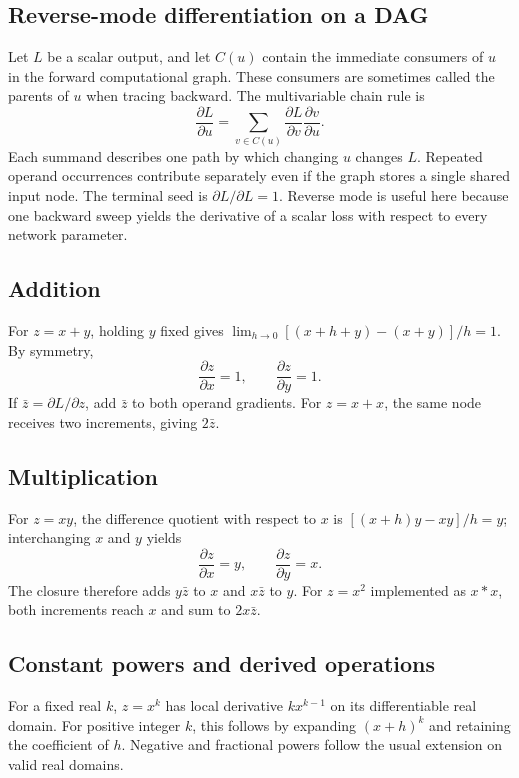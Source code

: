 \documentclass[11pt,a4paper]{article}
\begin{document}
\subsection{Reverse-mode differentiation on a DAG}
Let $L$ be a scalar output, and let $C(u)$ contain the immediate consumers of
$u$ in the forward computational graph. These consumers are sometimes called
the parents of $u$ when tracing backward. The multivariable chain rule is
\begin{equation}
 \frac{\partial L}{\partial u} =
 \sum_{v\in C(u)}\frac{\partial L}{\partial v}
                         \frac{\partial v}{\partial u}.
 \label{eq:dag}
\end{equation}
Each summand describes one path by which changing $u$ changes $L$.
Repeated operand occurrences contribute separately even if the graph stores a
single shared input node. The terminal seed is $\partial L/\partial L=1$.
Reverse mode is useful here because one backward sweep yields the derivative
of a scalar loss with respect to every network parameter.

\subsection{Addition}
For $z=x+y$, holding $y$ fixed gives
$\lim_{h\to0}[(x+h+y)-(x+y)]/h=1$. By symmetry,
\[
 \frac{\partial z}{\partial x}=1,\qquad
 \frac{\partial z}{\partial y}=1.
\]
If $\bar z=\partial L/\partial z$, add $\bar z$ to both operand gradients.
For $z=x+x$, the same node receives two increments, giving $2\bar z$.

\subsection{Multiplication}
For $z=xy$, the difference quotient with respect to $x$ is
$[(x+h)y-xy]/h=y$; interchanging $x$ and $y$ yields
\[
 \frac{\partial z}{\partial x}=y,\qquad
 \frac{\partial z}{\partial y}=x.
\]
The closure therefore adds $y\bar z$ to $x$ and $x\bar z$ to $y$.
For $z=x^2$ implemented as $x*x$, both increments reach $x$ and sum to
$2x\bar z$.

\subsection{Constant powers and derived operations}
For a fixed real $k$, $z=x^k$ has local derivative $kx^{k-1}$ on its
differentiable real domain. For positive integer $k$, this follows by expanding
$(x+h)^k$ and retaining the coefficient of $h$. Negative and fractional powers
follow the usual extension on valid real domains.
\end{document}
